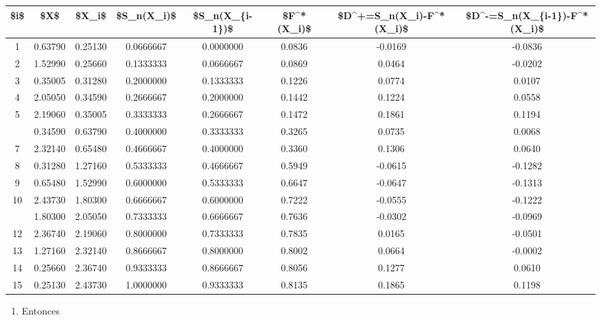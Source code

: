 \documentclass[
  a4paper,
  oneside,
  openany]{book}
\providecommand{\tightlist}{%
  \setlength{\itemsep}{0pt}\setlength{\parskip}{0pt}}
\begin{document}
\begin{table}
\centering
\begin{tabular}{cccccccc}
\toprule
\$i\$ & \$X\$ & \$X\_i\$ & \$S\_n(X\_i)\$ & \$S\_n(X\_\{i-1\})\$ & \$F\textasciicircum{}*(X\_i)\$ & \$D\textasciicircum{}+=S\_n(X\_i)-F\textasciicircum{}*(X\_i)\$ & \$D\textasciicircum{}-=S\_n(X\_\{i-1\})-F\textasciicircum{}*(X\_i)\$\\
\midrule
1 & 0.63790 & 0.25130 & 0.0666667 & 0.0000000 & 0.0836 & -0.0169 & -0.0836\\
2 & 1.52990 & 0.25660 & 0.1333333 & 0.0666667 & 0.0869 & 0.0464 & -0.0202\\
3 & 0.35005 & 0.31280 & 0.2000000 & 0.1333333 & 0.1226 & 0.0774 & 0.0107\\
4 & 2.05050 & 0.34590 & 0.2666667 & 0.2000000 & 0.1442 & 0.1224 & 0.0558\\
5 & 2.19060 & 0.35005 & 0.3333333 & 0.2666667 & 0.1472 & 0.1861 & 0.1194\\
\addlinespace
6 & 0.34590 & 0.63790 & 0.4000000 & 0.3333333 & 0.3265 & 0.0735 & 0.0068\\
7 & 2.32140 & 0.65480 & 0.4666667 & 0.4000000 & 0.3360 & 0.1306 & 0.0640\\
8 & 0.31280 & 1.27160 & 0.5333333 & 0.4666667 & 0.5949 & -0.0615 & -0.1282\\
9 & 0.65480 & 1.52990 & 0.6000000 & 0.5333333 & 0.6647 & -0.0647 & -0.1313\\
10 & 2.43730 & 1.80300 & 0.6666667 & 0.6000000 & 0.7222 & -0.0555 & -0.1222\\
\addlinespace
11 & 1.80300 & 2.05050 & 0.7333333 & 0.6666667 & 0.7636 & -0.0302 & -0.0969\\
12 & 2.36740 & 2.19060 & 0.8000000 & 0.7333333 & 0.7835 & 0.0165 & -0.0501\\
13 & 1.27160 & 2.32140 & 0.8666667 & 0.8000000 & 0.8002 & 0.0664 & -0.0002\\
14 & 0.25660 & 2.36740 & 0.9333333 & 0.8666667 & 0.8056 & 0.1277 & 0.0610\\
15 & 0.25130 & 2.43730 & 1.0000000 & 0.9333333 & 0.8135 & 0.1865 & 0.1198\\
\bottomrule
\end{tabular}
\end{table}

\begin{enumerate}
\def\labelenumi{\arabic{enumi})}
\setcounter{enumi}{7}
\tightlist
\item
  Entonces
\end{enumerate}
\end{document}
